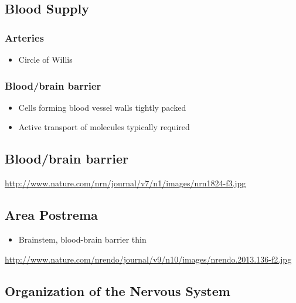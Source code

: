 \documentclass[]{article}
\providecommand{\tightlist}{%
  \setlength{\itemsep}{0pt}\setlength{\parskip}{0pt}}
\begin{document}
\subsection{Blood Supply}\label{blood-supply-2}

\subsubsection{Arteries}\label{arteries}

\begin{itemize}
\tightlist
\item
  Circle of Willis
\end{itemize}

\subsubsection{Blood/brain barrier}\label{bloodbrain-barrier}

\begin{itemize}
\tightlist
\item
  Cells forming blood vessel walls tightly packed
\item
  Active transport of molecules typically required
\end{itemize}

\subsection{Blood/brain barrier}\label{bloodbrain-barrier-1}

\url{http://www.nature.com/nrn/journal/v7/n1/images/nrn1824-f3.jpg}

\subsection{Area Postrema}\label{area-postrema}

\begin{itemize}
\tightlist
\item
  Brainstem, blood-brain barrier thin
\end{itemize}

\url{http://www.nature.com/nrendo/journal/v9/n10/images/nrendo.2013.136-f2.jpg}

\subsection{Organization of the Nervous
System}\label{organization-of-the-nervous-system}
\end{document}
